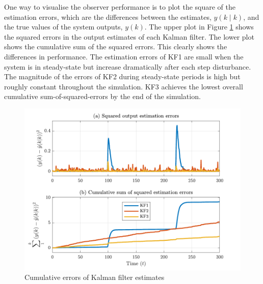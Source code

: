 One way to visualise the observer performance is to plot the square of the estimation errors, which are the differences between the estimates, $\hat{y}(k \mid k)$, and the true values of the system outputs, $y(k)$. The upper plot in Figure \ref{fig:sim-sys-siso-KF123-cumerr} shows the squared errors in the output estimates of each Kalman filter. The lower plot shows the cumulative sum of the squared errors. This clearly shows the differences in performance. The estimation errors of KF1 are small when the system is in steady-state but increase dramatically after each step disturbance. The magnitude of the errors of KF2 during steady-state periods is high but roughly constant throughout the simulation. KF3 achieves the lowest overall cumulative sum-of-squared-errors by the end of the simulation.
\begin{figure}[htp]
	\centering
	\includegraphics[width=13cm]{images/rod_obs_sim1_cum_err.pdf}
	\caption{Cumulative errors of Kalman filter estimates}
	\label{fig:sim-sys-siso-KF123-cumerr}
\end{figure}

